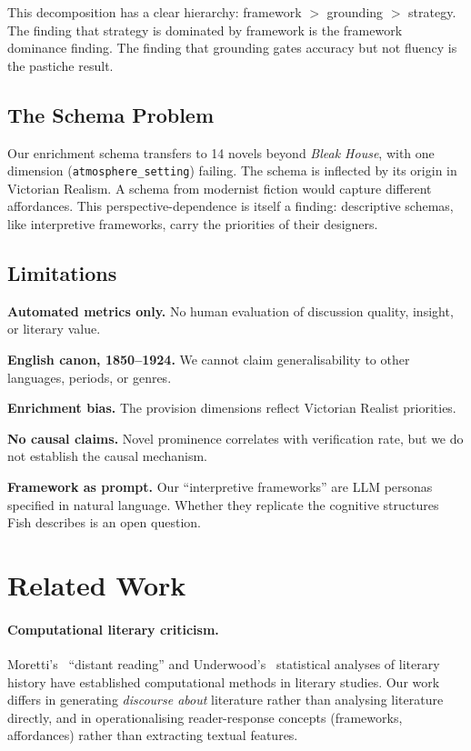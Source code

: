 \documentclass[final]{clv2025}
\begin{document}
This decomposition has a clear hierarchy: framework $>$ grounding $>$
strategy.  The finding that strategy is dominated by framework is the
framework dominance finding.  The finding that grounding gates accuracy but not
fluency is the pastiche result.

\subsection{The Schema Problem}

Our enrichment schema transfers to 14 novels beyond \textit{Bleak
House}, with one dimension (\texttt{atmosphere\_setting}) failing.
The schema is inflected by its origin in Victorian Realism.  A schema
from modernist fiction would capture different affordances.  This
perspective-dependence is itself a finding: descriptive schemas, like
interpretive frameworks, carry the priorities of their designers.

\subsection{Limitations}

\textbf{Automated metrics only.}  No human evaluation of discussion
quality, insight, or literary value.

\textbf{English canon, 1850--1924.}  We cannot claim generalisability
to other languages, periods, or genres.

\textbf{Enrichment bias.}  The provision dimensions reflect Victorian
Realist priorities.

\textbf{No causal claims.}  Novel prominence correlates with
verification rate, but we do not establish the causal mechanism.

\textbf{Framework as prompt.}  Our ``interpretive frameworks'' are
LLM personas specified in natural language.  Whether they replicate the
cognitive structures Fish describes is an open question.


\section{Related Work}
\label{sec:related}

\paragraph{Computational literary criticism.}
Moretti's~\cite{moretti2013distant} ``distant reading'' and
Underwood's~\cite{underwood2019distant} statistical analyses of
literary history have established computational methods in literary
studies.  Our work differs in generating \emph{discourse about}
literature rather than analysing literature directly, and in
operationalising reader-response concepts (frameworks, affordances)
rather than extracting textual features.
\end{document}
